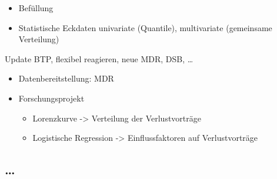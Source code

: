 \documentclass[
  german,
  10pt,
  twoside]{article}
\providecommand{\tightlist}{%
  \setlength{\itemsep}{0pt}\setlength{\parskip}{0pt}}
\begin{document}
\begin{itemize}
\tightlist
\item
  Befüllung
\item
  Statistische Eckdaten univariate (Quantile), multivariate (gemeinsame
  Verteilung)
\end{itemize}

Update BTP, flexibel reagieren, neue MDR, DSB, \ldots{}

\begin{itemize}
\tightlist
\item
  Datenbereitstellung: MDR
\item
  Forschungsprojekt

  \begin{itemize}
  \tightlist
  \item
    Lorenzkurve -\textgreater{} Verteilung der Verlustvorträge
  \item
    Logistische Regression -\textgreater{} Einflussfaktoren auf
    Verlustvorträge
  \end{itemize}
\end{itemize}

\subsection{\ldots{}}\label{section}
\end{document}
